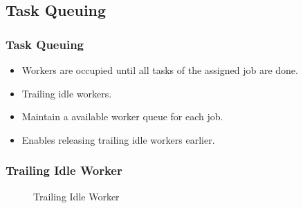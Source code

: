\subsection{Task Queuing}
\begin{frame}
  \frametitle{Task Queuing}
  \begin{itemize}
    \item Workers are occupied until all tasks of the assigned job are
      done.
    \item Trailing idle workers.
    \item Maintain a available worker queue for each job.
    \item Enables releasing trailing idle workers earlier.
  \end{itemize}
\end{frame}

\begin{frame}
  \frametitle{Trailing Idle Worker}

  \begin{figure}[h]
    \centering
    \resizebox{\textheight}{!}{
      
    }
    \caption{Trailing Idle Worker}
  \end{figure}
\end{frame}

